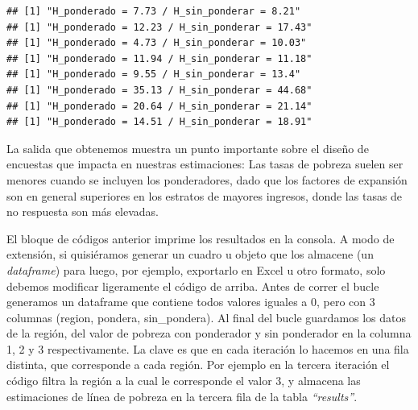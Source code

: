 \documentclass[
]{book}
\begin{document}
\begin{verbatim}
## [1] "H_ponderado = 7.73 / H_sin_ponderar = 8.21"
## [1] "H_ponderado = 12.23 / H_sin_ponderar = 17.43"
## [1] "H_ponderado = 4.73 / H_sin_ponderar = 10.03"
## [1] "H_ponderado = 11.94 / H_sin_ponderar = 11.18"
## [1] "H_ponderado = 9.55 / H_sin_ponderar = 13.4"
## [1] "H_ponderado = 35.13 / H_sin_ponderar = 44.68"
## [1] "H_ponderado = 20.64 / H_sin_ponderar = 21.14"
## [1] "H_ponderado = 14.51 / H_sin_ponderar = 18.91"
\end{verbatim}

La salida que obtenemos muestra un punto importante sobre el diseño de encuestas que impacta en nuestras estimaciones: Las tasas de pobreza suelen ser menores cuando se incluyen los ponderadores, dado que los factores de expansión son en general superiores en los estratos de mayores ingresos, donde las tasas de no respuesta son más elevadas.

El bloque de códigos anterior imprime los resultados en la consola. A modo de extensión, si quisiéramos generar un cuadro u objeto que los almacene (un \emph{dataframe}) para luego, por ejemplo, exportarlo en Excel u otro formato, solo debemos modificar ligeramente el código de arriba. Antes de correr el bucle generamos un dataframe que contiene todos valores iguales a 0, pero con 3 columnas (region, pondera, sin\_pondera). Al final del bucle guardamos los datos de la región, del valor de pobreza con ponderador y sin ponderador en la columna 1, 2 y 3 respectivamente. La clave es que en cada iteración lo hacemos en una fila distinta, que corresponde a cada región. Por ejemplo en la tercera iteración el código filtra la región a la cual le corresponde el valor 3, y almacena las estimaciones de línea de pobreza en la tercera fila de la tabla \emph{``results''}.
\end{document}
